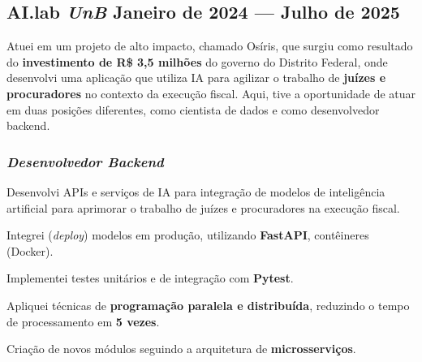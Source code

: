 \documentclass[a4paper,12pt]{article}
\begin{document}



\subsection*{\large AI.lab \textbf{\textit{UnB}} \hfill Janeiro de 2024 --- Julho de 2025}
\vspace{0.5em}


Atuei em um projeto de alto impacto, chamado Osíris, que surgiu como resultado do \textbf{investimento de R\$ 3,5
milhões} do governo do Distrito Federal, onde desenvolvi uma aplicação que utiliza IA
para agilizar o trabalho de \textbf{juízes e procuradores} no contexto da execução fiscal. Aqui, tive a oportunidade
de atuar em duas posições diferentes, como cientista de dados e como desenvolvedor backend.

\subsubsection*{\small \textit{Desenvolvedor Backend} }
\vspace{-1.3em}
\vspace{-0.5em}
\begin{zitemize}
    \item Desenvolvi APIs e serviços de IA para integração de modelos de inteligência artificial para aprimorar o trabalho de juízes e procuradores na execução fiscal.
    \item Integrei (\textit{deploy}) modelos em produção, utilizando  \textbf{FastAPI}, contêineres (Docker).
    \item Implementei testes unitários e de integração com \textbf{Pytest}.
    \item Apliquei técnicas de \textbf{programação paralela e distribuída}, reduzindo o tempo de processamento em \textbf{5 vezes}.
    \item Criação de novos módulos seguindo a arquitetura de \textbf{microsserviços}.
\end{zitemize}
\end{document}
